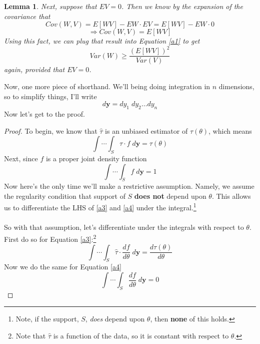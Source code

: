 \documentclass[a4paper,12pt]{scrartcl}
\newtheorem{lem}[thm]{Lemma}
\begin{document}
\begin{lem} Next, suppose that $EV = 0$. Then we know by the expansion
   of the covariance that
   \[ Cov(W,V) = E[WV] - EW\cdot EV = E[WV] - EW\cdot 0   \]
   \[ \Rightarrow Cov(W,V) = E[WV] \]
   Using this fact, we can plug that result into Equation \ref{a1} to
   get
      \begin{equation}
	 \label{a2}
	 Var(W) \geq \frac{(E[WV])^2}{Var(V)}
      \end{equation}
   again, provided that $EV = 0$.
\end{lem}
Now, one more piece of shorthand. We'll being doing integration in
$n$ dimensions, so to simplify things, I'll write
   \[ d\mathbf{y} = dy_1 \; dy_2  \ldots dy_n  \]
Now let's get to the proof.

\begin{proof} To begin, we know that $\hat{\tau}$ is an unbiased
   estimator of $\tau(\theta)$, which means
   \begin{equation}
      \label{a3}
      \int \cdots \int_S  \hat{\tau} \cdot f \; d\mathbf{y} =
	 \tau(\theta)
   \end{equation}
   Next, since $f$ is a proper joint density function
   \begin{equation}
      \label{a4}
      \int \cdots \int_S   f \; d\mathbf{y} = 1
   \end{equation}
   Now here's the only time we'll make a restrictive assumption. Namely,
   we assume the regularity condition that support of $S$
   \textbf{does not} depend upon $\theta$.  This allows us to
   differentiate the LHS of \ref{a3} and \ref{a4} under the
   integral.\footnote{Note, if the support, $S$, \emph{does} depend upon
   $\theta$, then \textbf{none} of this holds.}
   \\
   \\
   So with that assumption, let's differentiate under the integrals with
   respect to $\theta$. First do so for Equation \ref{a3}:\footnote{Note
      that $\hat{\tau}$ is a function of the data, so it is constant
      with respect to $\theta$.}
   \begin{equation}
      \label{a5}
      \int \cdots \int_S  \hat{\tau} \cdot \frac{df}{d\theta}
      \; d\mathbf{y} = \frac{d\tau(\theta)}{d\theta}
   \end{equation}
   Now we do the same for Equation \ref{a4}
   \begin{equation}
      \label{a6}
      \int \cdots \int_S \frac{df}{d\theta}  \; d\mathbf{y} = 0
   \end{equation}

\end{proof}
\end{document}
